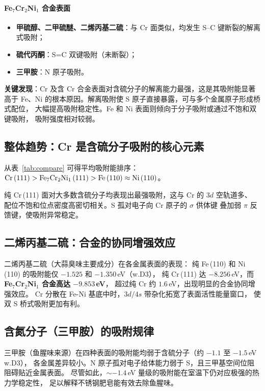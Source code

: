 \documentclass[12pt, a4paper]{article}
\begin{document}
\paragraph{Fe$_7$Cr$_2$Ni$_1$ 合金表面}
\begin{itemize}[leftmargin=2em]
  \item \textbf{甲硫醇、二甲硫醚、二烯丙基二硫}：与 Cr 面类似，均发生 S--C 键断裂的解离式吸附；
  \item \textbf{硫代丙酮}：S=C 双键吸附（未断裂）；
  \item \textbf{三甲胺}：N 原子吸附。
\end{itemize}

\textbf{关键发现}：Cr 及含 Cr 合金表面对含硫分子的解离能力最强，这是其吸附能显著高于
Fe、Ni 的根本原因。解离吸附使 S 原子直接暴露，可与多个金属原子形成桥式配位，
大幅提高吸附稳定性。Fe 和 Ni 表面则倾向于分子吸附或通过不饱和双键吸附，
吸附强度相对较弱。

\subsection{整体趋势：Cr 是含硫分子吸附的核心元素}

从表~\ref{tab:compare} 可得平均吸附能排序：
$\text{Cr\,(111)} > \text{Fe}_7\text{Cr}_2\text{Ni}_1\,(111) > \text{Fe\,(110)} \approx \text{Ni\,(110)}$。

纯 Cr\,(111) 面对大多数含硫分子均表现出最强吸附，这与 Cr 的 $3d$ 空轨道多、
配位不饱和位点密度高密切相关。S 孤对电子向 Cr 原子的 $\sigma$ 供体键
叠加弱 $\pi$ 反馈键，使吸附异常稳定。

\subsection{二烯丙基二硫：合金的协同增强效应}

二烯丙基二硫（大蒜臭味主要成分）在各金属表面的表现：
纯 Fe\,(110) 和 Ni\,(110) 的吸附能仅 $-1.525$ 和 $-1.350$\,eV（w.D3），
纯 Cr\,(111) 达 $-8.256$\,eV，而 \textbf{Fe$_7$Cr$_2$Ni$_1$ 合金高达 $-9.853$\,eV}，
超过纯 Cr 约 $1.6$\,eV，出现明显的合金协同增强效应。
Cr 分散在 Fe-Ni 基底中时，$3d/4s$ 带杂化拓宽了表面活性能量窗口，
使双 S 桥式吸附更加有利。

\subsection{含氮分子（三甲胺）的吸附规律}

三甲胺（鱼腥味来源）在四种表面的吸附能均弱于含硫分子（约 $-1.1$ 至 $-1.5$\,eV w.D3），
各金属差异较小。N 原子孤对电子给体能力弱于 S，且三甲基空间位阻阻碍贴近金属表面。
尽管如此，$\sim -1.4$\,eV 量级的吸附能在室温下仍对应极强的热力学稳定性，
足以解释不锈钢肥皂能有效去除鱼腥味。
\end{document}
